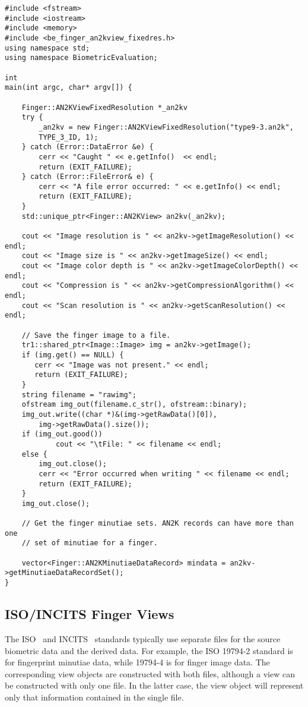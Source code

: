 \begin{lstlisting}[caption={Using an AN2K Finger View}, label=lst:an2kfingerviewuse]
#include <fstream>
#include <iostream>
#include <memory>
#include <be_finger_an2kview_fixedres.h>
using namespace std;
using namespace BiometricEvaluation;

int
main(int argc, char* argv[]) {

    Finger::AN2KViewFixedResolution *_an2kv
    try {
        _an2kv = new Finger::AN2KViewFixedResolution("type9-3.an2k",
	    TYPE_3_ID, 1);
    } catch (Error::DataError &e) {
        cerr << "Caught " << e.getInfo()  << endl;
        return (EXIT_FAILURE);
    } catch (Error::FileError& e) {
        cerr << "A file error occurred: " << e.getInfo() << endl;
        return (EXIT_FAILURE);
    }
    std::unique_ptr<Finger::AN2KView> an2kv(_an2kv);

    cout << "Image resolution is " << an2kv->getImageResolution() << endl;
    cout << "Image size is " << an2kv->getImageSize() << endl;
    cout << "Image color depth is " << an2kv->getImageColorDepth() << endl;
    cout << "Compression is " << an2kv->getCompressionAlgorithm() << endl;
    cout << "Scan resolution is " << an2kv->getScanResolution() << endl;

    // Save the finger image to a file.
    tr1::shared_ptr<Image::Image> img = an2kv->getImage();
    if (img.get() == NULL) {
       cerr << "Image was not present." << endl;
       return (EXIT_FAILURE);
    }
    string filename = "rawimg";
    ofstream img_out(filename.c_str(), ofstream::binary);
    img_out.write((char *)&(img->getRawData()[0]),
        img->getRawData().size());
    if (img_out.good())
            cout << "\tFile: " << filename << endl;
    else {
        img_out.close();
        cerr << "Error occurred when writing " << filename << endl;
        return (EXIT_FAILURE);
    }
    img_out.close();

    // Get the finger minutiae sets. AN2K records can have more than one
    // set of minutiae for a finger.

    vector<Finger::AN2KMinutiaeDataRecord> mindata = an2kv->getMinutiaeDataRecordSet();
}
\end{lstlisting}

\subsection{ISO/INCITS Finger Views}

The ISO~\cite{org:iso:sc37} and INCITS~\cite{org:incits} standards typically use
separate files for the source biometric data and the derived data. For example,
the ISO 19794-2 standard is for fingerprint minutiae data, while 19794-4 is for
finger image data. The corresponding \sname view objects are constructed with
both files, although a view can be constructed with only one file. In the
latter case, the view object will represent only that information contained in
the single file.

